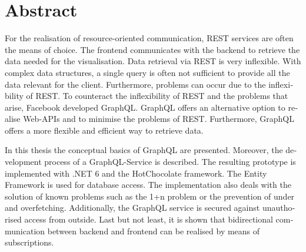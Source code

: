 \chapter{Abstract}

\begin{english} %
For the realisation of resource-oriented communication, REST services are often the means of choice.
The frontend communicates with the backend to retrieve the data needed for the visualisation.
Data retrieval via REST is very inflexible.
With complex data structures, a single query is often not sufficient to provide all the data relevant for the client.
Furthermore, problems can occur due to the inflexibility of REST.
To counteract the inflexibility of REST and the problems that arise, Facebook developed GraphQL.
GraphQL offers an alternative option to realise Web-APIs and to minimise the problems of REST.
Furthermore, GraphQL offers a more flexible and efficient way to retrieve data.
\newline

In this thesis the conceptual basics of GraphQL are presented.
Moreover, the development process of a GraphQL-Service is described.
The resulting prototype is implemented with .NET 6 and the HotChocolate framework.
The Entity Framework is used for database access.
The implementation also deals with the solution of known problems such as the 1+n problem or the prevention of under and overfetching.
Additionally, the GraphQL service is secured against unauthorised access from outside.
Last but not least, it is shown that bidirectional communication between backend and frontend can be realised by means of subscriptions.
    
\end{english}